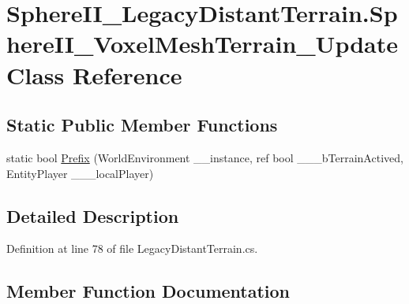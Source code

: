 \hypertarget{class_sphere_i_i___legacy_distant_terrain_1_1_sphere_i_i___voxel_mesh_terrain___update}{}\section{Sphere\+I\+I\+\_\+\+Legacy\+Distant\+Terrain.\+Sphere\+I\+I\+\_\+\+Voxel\+Mesh\+Terrain\+\_\+\+Update Class Reference}
\label{class_sphere_i_i___legacy_distant_terrain_1_1_sphere_i_i___voxel_mesh_terrain___update}
\subsection*{Static Public Member Functions}
\begin{DoxyCompactItemize}
\item 
static bool \mbox{\hyperlink{class_sphere_i_i___legacy_distant_terrain_1_1_sphere_i_i___voxel_mesh_terrain___update_a67bd950c6e462dabe54ec055a89d2960}{Prefix}} (World\+Environment \+\_\+\+\_\+instance, ref bool \+\_\+\+\_\+\+\_\+b\+Terrain\+Actived, Entity\+Player \+\_\+\+\_\+\+\_\+local\+Player)
\end{DoxyCompactItemize}


\subsection{Detailed Description}


Definition at line 78 of file Legacy\+Distant\+Terrain.\+cs.



\subsection{Member Function Documentation}
\mbox{\label{class_sphere_i_i___legacy_distant_terrain_1_1_sphere_i_i___voxel_mesh_terrain___update_a67bd950c6e462dabe54ec055a89d2960}} 
